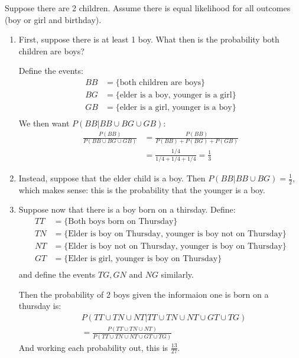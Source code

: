 \documentclass[../Main.tex]{subfiles}
\begin{document}
\begin{example}
        Suppose there are 2 children. Assume there is equal likelihood for all outcomes (boy or girl and birthday).
        \begin{enumerate}
        \item First, suppose there is at least 1 boy. What then is the probability both children are boys?\par
        Define the events:
        \begin{align*}
            BB &= \{\text{both children are boys}\} \\
            BG &= \{\text{elder is a boy, younger is a girl}\} \\
            GB &= \{\text{elder is a girl, younger is a boy}\} \\
        \end{align*}
        We then want $P(BB | BB \cup BG \cup GB)$:
        \begin{align*}
            \frac{P(BB)}{P(BB \cup BG \cup GB)} &= \frac{P(BB)}{P(BB) + P(BG) + P(GB)} \\
            &= \frac{1/4}{1/4 + 1/4 + 1/4} = \frac{1}{3}
        \end{align*}
        \item Instead, suppose that the elder child is a boy.
        Then $P(BB | BB \cup BG) = \frac{1}{2}$, which makes sense: this is the probability that the younger is a boy.
        \item Suppose now that there is a boy born on a thirsday. Define:
            \begin{align*}
                TT &= \{\text{Both boys born on Thursday}\} \\
                TN &= \{\text{Elder is boy on Thursday, younger is boy not on Thursday}\} \\
                NT &= \{\text{Elder is boy not on Thursday, younger is boy on Thursday}\} \\
                GT &= \{\text{Elder is girl, younger is boy on Thursday}\} \\
            \end{align*}
            and define the events $TG, GN$ and $NG$ similarly.\par
            Then the probability of 2 boys given the informaion one is born on a thursday is:
            \begin{align*}
                &P(TT \cup TN \cup NT | TT \cup TN \cup NT \cup GT \cup TG) \\
                &= \frac{P(TT \cup TN \cup NT)}{P(TT \cup TN \cup NT \cup GT \cup TG)}
            \end{align*}
            And working each probability out, this is $\frac{13}{27}$.
    \end{enumerate}
\end{example}
\end{document}
